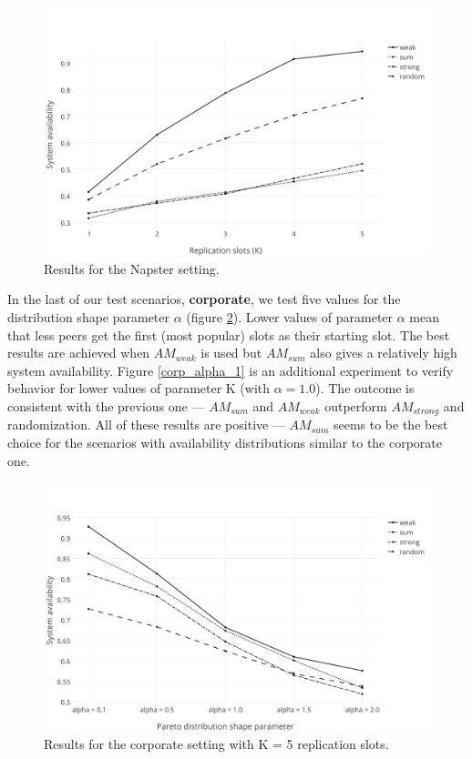 \documentclass{pracamgren}
\begin{document}
\begin{figure}[h]
\centering
\includegraphics[scale=0.5]{graphs/napster.pdf}
\caption{Results for the Napster setting.}
\label{napster}
\end{figure} 
 
In the last of our test scenarios, {\bf corporate}, we test five values for the distribution shape parameter $\alpha$ (figure \ref{corp_5}). Lower values of parameter $\alpha$ mean that less peers get the first (most popular) slots as their starting slot. The best results are achieved when $AM_{weak}$ is used but $AM_{sum}$ also gives a relatively high system availability. Figure \ref{corp_alpha_1} is an additional experiment to verify behavior for lower values of parameter K (with $\alpha=1.0$). The outcome is consistent with the previous one --- $AM_{sum}$ and $AM_{weak}$ outperform $AM_{strong}$ and randomization. All of these results are positive --- $AM_{sum}$ seems to be the best choice for the scenarios with availability distributions similar to the corporate one.\\
 
\begin{figure}[h]
\centering
\includegraphics[scale=0.5]{graphs/corp_5.pdf}
\caption{Results for the corporate setting with K = 5 replication slots.}
\label{corp_5}
\end{figure}
\end{document}

